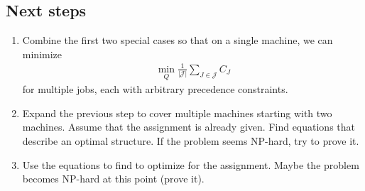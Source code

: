 \subsection{Next steps}
\begin{enumerate}
	\item Combine the first two special cases so that on a single machine, we can minimize
	\begin{align}
		\min_Q \frac{1}{|\mathcal{J}|}\sum_{J\in\mathcal{J}} C_J
	\end{align}
	for multiple jobs, each with arbitrary precedence constraints.
	\item Expand the previous step to cover multiple machines starting with two machines.
	Assume that the assignment is already given.
	Find equations that describe an optimal structure.
	If the problem seems NP-hard, try to prove it.
	\item Use the equations to find to optimize for the assignment.  Maybe the problem becomes NP-hard at this point (prove it).
\end{enumerate}
